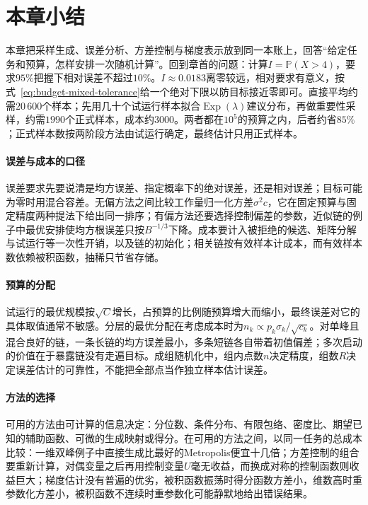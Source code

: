 \section{本章小结}
\label{sec:budget-summary}

本章把采样生成、误差分析、方差控制与梯度表示放到同一本账上，回答“给定任务和预算，怎样安排一次随机计算”。回到章首的问题：计算$I=\mathbb{P}(X>4)$，要求$95\%$把握下相对误差不超过$10\%$。$I\approx0.0183$离零较远，相对要求有意义，按式~\eqref{eq:budget-mixed-tolerance}给一个绝对下限以防目标接近零即可。直接平均约需$20\,600$个样本；先用几十个试运行样本拟合$\operatorname{Exp}(\lambda)$建议分布，再做重要性采样，约需$1990$个正式样本，成本约$3000$。两者都在$10^{5}$的预算之内，后者约省$85\%$；正式样本数按两阶段方法由试运行确定，最终估计只用正式样本。

\paragraph{误差与成本的口径}
误差要求先要说清是均方误差、指定概率下的绝对误差，还是相对误差；目标可能为零时用混合容差。无偏方法之间比较工作量归一化方差$\sigma^{2}c$，它在固定预算与固定精度两种提法下给出同一排序；有偏方法还要选择控制偏差的参数，近似链的例子中最优安排使均方根误差只按$B^{-1/3}$下降。成本要计入被拒绝的候选、矩阵分解与试运行等一次性开销，以及链的初始化；相关链按有效样本计成本，而有效样本数依赖被积函数，抽稀只节省存储。

\paragraph{预算的分配}
试运行的最优规模按$\sqrt{C}$增长，占预算的比例随预算增大而缩小，最终误差对它的具体取值通常不敏感。分层的最优分配在考虑成本时为$n_k\propto p_k\sigma_k/\sqrt{c_k}$。对单峰且混合良好的链，一条长链的均方误差最小，多条短链各自带着初值偏差；多次启动的价值在于暴露链没有走遍目标。成组随机化中，组内点数$n$决定精度，组数$R$决定误差估计的可靠性，不能把全部点当作独立样本估计误差。

\paragraph{方法的选择}
可用的方法由可计算的信息决定：分位数、条件分布、有限包络、密度比、期望已知的辅助函数、可微的生成映射或得分。在可用的方法之间，以同一任务的总成本比较：一维双峰例子中直接生成比最好的Metropolis便宜十几倍；方差控制的组合要重新计算，对偶变量之后再用控制变量$U$毫无收益，而换成对称的控制函数则收益巨大；梯度估计没有普遍的优劣，被积函数振荡时得分函数方差小，维数高时重参数化方差小，被积函数不连续时重参数化可能静默地给出错误结果。

